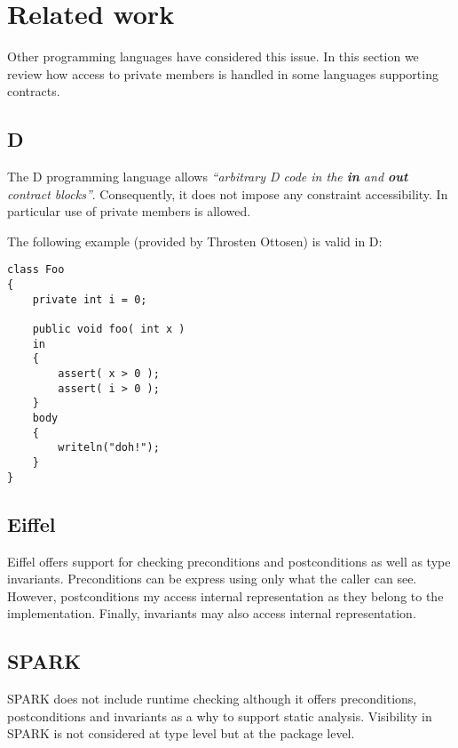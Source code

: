 \section{Related work}

Other programming languages have considered this issue. 
In this section we review how access to private members is handled
in some languages supporting contracts.

\subsection{D}

The D programming language allows \emph{``arbitrary D code in the \textbf{in}
and \textbf{out} contract blocks''}. Consequently, it does not impose any
constraint accessibility. In particular use of private members is allowed.

The following example (provided by Throsten Ottosen) is valid in D:

\begin{lstlisting}[morekeywords={in,body}]
class Foo
{
    private int i = 0;
    
    public void foo( int x ) 
    in
    {
        assert( x > 0 );
        assert( i > 0 );
    }
    body
    {
        writeln("doh!"); 
    }
}
\end{lstlisting}

\subsection{Eiffel}

Eiffel offers support for checking preconditions and postconditions as well as
type invariants. Preconditions can be express using only what the caller can
see. However, postconditions my access internal representation as they belong to
the implementation. Finally, invariants may also access internal representation.

\subsection{SPARK}

SPARK does not include runtime checking although it offers preconditions,
postconditions and invariants as a why to support static analysis. Visibility in
SPARK is not considered at type level but at the package level.


